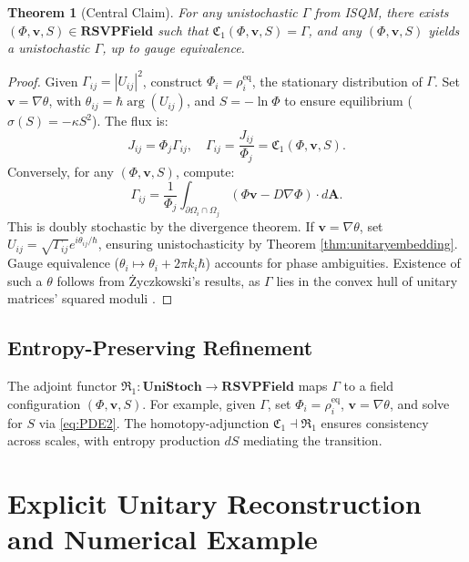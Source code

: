\documentclass[12pt]{article}
\newtheorem{theorem}{Theorem}
\begin{document}
\begin{theorem}[Central Claim]
\label{thm:central}
For any unistochastic \(\Gamma\) from ISQM, there exists \((\Phi, \mathbf{v}, S) \in \mathbf{RSVPField}\) such that \(\mathfrak{C}_1(\Phi, \mathbf{v}, S) = \Gamma\), and any \((\Phi, \mathbf{v}, S)\) yields a unistochastic \(\Gamma\), up to gauge equivalence.
\end{theorem}

\begin{proof}
Given \(\Gamma_{ij} = |U_{ij}|^2\), construct \(\Phi_i = \rho_i^{\text{eq}}\), the stationary distribution of \(\Gamma\). Set \(\mathbf{v} = \nabla \theta\), with \(\theta_{ij} = \hbar \arg(U_{ij})\), and \(S = -\ln \Phi\) to ensure equilibrium (\(\sigma(S) = -\kappa S^2\)). The flux is:
\[
J_{ij} = \Phi_j \Gamma_{ij}, \quad \Gamma_{ij} = \frac{J_{ij}}{\Phi_j} = \mathfrak{C}_1(\Phi, \mathbf{v}, S).
\]
Conversely, for any \((\Phi, \mathbf{v}, S)\), compute:
\[
\Gamma_{ij} = \frac{1}{\Phi_j} \int_{\partial \Omega_i \cap \Omega_j} (\Phi \mathbf{v} - D \nabla \Phi) \cdot d\mathbf{A}.
\]
This is doubly stochastic by the divergence theorem. If \(\mathbf{v} = \nabla \theta\), set \(U_{ij} = \sqrt{\Gamma_{ij}} e^{i \theta_{ij} / \hbar}\), ensuring unistochasticity by Theorem \ref{thm:unitaryembedding}. Gauge equivalence (\(\theta_i \mapsto \theta_i + 2\pi k_i \hbar\)) accounts for phase ambiguities. Existence of such a \(\theta\) follows from Życzkowski’s results, as \(\Gamma\) lies in the convex hull of unitary matrices’ squared moduli \cite{Zyczkowski1994}.
\end{proof}

\subsection{Entropy-Preserving Refinement}

The adjoint functor \(\mathfrak{R}_1: \mathbf{UniStoch} \to \mathbf{RSVPField}\) maps \(\Gamma\) to a field configuration \((\Phi, \mathbf{v}, S)\). For example, given \(\Gamma\), set \(\Phi_i = \rho_i^{\text{eq}}\), \(\mathbf{v} = \nabla \theta\), and solve for \(S\) via \eqref{eq:PDE2}. The homotopy-adjunction \(\mathfrak{C}_1 \dashv \mathfrak{R}_1\) ensures consistency across scales, with entropy production \(dS\) mediating the transition.

\section{Explicit Unitary Reconstruction and Numerical Example}
\end{document}
